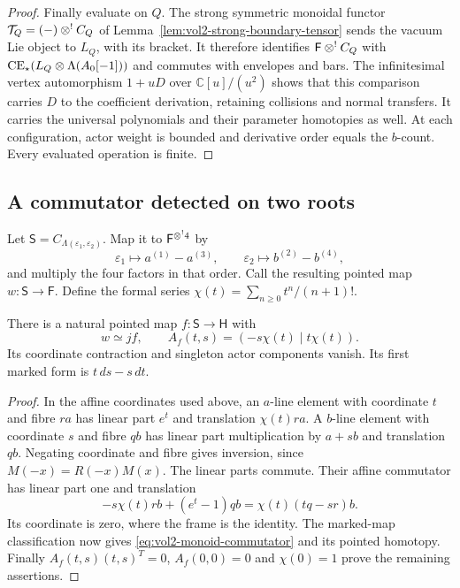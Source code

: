 \begin{proof}
Finally evaluate on $Q$. The strong symmetric monoidal functor
$\mathcal T_Q=(-)\mathbin{\otimes^!} C_Q$ of
Lemma~\ref{lem:vol2-strong-boundary-tensor} sends the vacuum
Lie object to $L_Q$, with its bracket. It therefore identifies
$\mathsf F\mathbin{\otimes^!} C_Q$ with
$\operatorname{CE}_{\star}(L_Q\otimes\Lambda(A_0[-1]))$ and commutes with envelopes
and bars. The infinitesimal vertex automorphism $1+uD$ over
$\mathbb C[u]/(u^2)$ shows that this comparison carries $D$ to
the coefficient derivation, retaining collisions and normal
transfers. It carries the universal polynomials and their
parameter homotopies as well. At each configuration, actor
weight is bounded and derivative order equals the $b$-count.
Every evaluated operation is finite.
\end{proof}

\subsection{A commutator detected on two roots}

Let $\mathsf S=C_{\Lambda(\varepsilon_1,\varepsilon_2)}$.
Map it to $\mathsf F^{\mathbin{\otimes^!}4}$ by
\[
 \varepsilon_1\longmapsto a^{(1)}-a^{(3)},\qquad
 \varepsilon_2\longmapsto b^{(2)}-b^{(4)},
\]
and multiply the four factors in that order. Call the resulting
pointed map $w:\mathsf S\to\mathsf F$. Define the formal series
$\chi(t)=\sum_{n\geq0}t^n/(n+1)!$.

\begin{lemma}\label{lem:vol2-monoid-commutator}
There is a natural pointed map $f:\mathsf S\to\mathsf H$ with
\begin{equation}\label{eq:vol2-monoid-commutator}
 w\simeq jf,\qquad A_f(t,s)=(-s\chi(t)\mid t\chi(t)).
\end{equation}
Its coordinate contraction and singleton actor components vanish.
Its first marked form is $t\,ds-s\,dt$.
\end{lemma}
\begin{proof}
In the affine coordinates used above, an $a$-line element with
coordinate $t$ and fibre $ra$ has linear part $e^t$ and
translation $\chi(t)ra$. A $b$-line element with coordinate $s$
and fibre $qb$ has linear part multiplication by $a+sb$ and
translation $qb$. Negating coordinate and fibre gives inversion,
since $M(-x)=R(-x)M(x)$. The linear parts commute. Their affine
commutator has linear part one and translation
\[
 -s\chi(t)rb+(e^t-1)qb=\chi(t)(tq-sr)b.
\]
Its coordinate is zero, where the frame is the identity.
The marked-map classification now gives \eqref{eq:vol2-monoid-commutator}
and its pointed homotopy. Finally $A_f(t,s)(t,s)^T=0$,
$A_f(0,0)=0$ and $\chi(0)=1$ prove the remaining assertions.
\end{proof}

